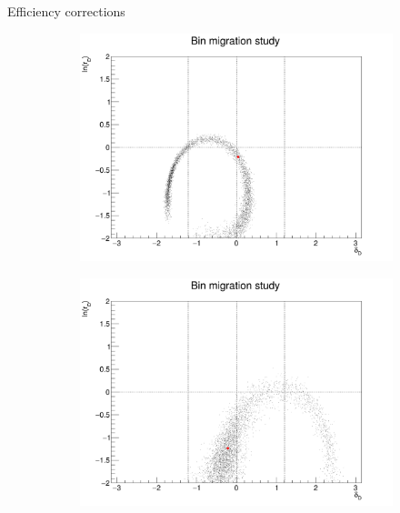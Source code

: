 \documentclass{beamer}
\begin{document}
\begin{frame}{Efficiency corrections}
  \begin{figure}
    \centering
    \begin{subfigure}{0.38\textwidth}
      \centering
      \includegraphics[width=\textwidth]{Plots/BinMigration_Point10.png}
    \end{subfigure}%
    \begin{subfigure}{0.38\textwidth}
      \centering
      \includegraphics[width=\textwidth]{Plots/BinMigration_Point12.png}
    \end{subfigure}
    \begin{subfigure}{0.38\textwidth}
      \centering

\end{subfigure}
\end{figure}
\end{frame}
\end{document}

